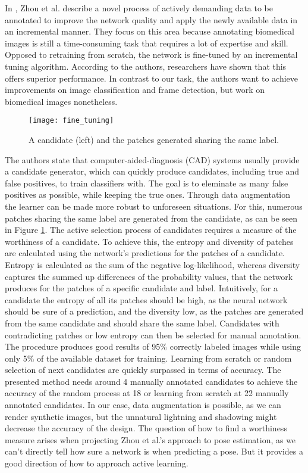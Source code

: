 In \cite{zhou}, Zhou et al. describe a novel process of actively demanding data to be annotated to improve the network quality and apply the newly available data in an incremental manner. They focus on this area because annotating biomedical images is still a time-consuming task that requires a lot of expertise and skill.
\nnewline
Opposed to retraining from scratch, the network is fine-tuned by an incremental tuning algorithm. According to the authors, researchers have shown that this offers superior performance. In contrast to our task, the authors want to achieve improvements on image classification and frame detection, but work on biomedical images nonetheless.
\nnewline
\begin{figure}[!tbp]
	\centering
    \texttt{[image: fine\_tuning]}
	\caption{A candidate (left) and the patches generated sharing the same label. \cite{zhou}}
	\label{fig:zhou}
\end{figure}
The authors state that computer-aided-diagnosis (CAD) systems usually provide a candidate generator, which can quickly produce candidates, including true and false positives, to train classifiers with. The goal is to eleminate as many false positives as possible, while keeping the true ones. Through data augmentation the learner can be made more robust to unforeseen situations. For this, numerous patches sharing the same label are generated from the candidate, as can be seen in Figure \ref{fig:zhou}. 
\nnewline
The active selection process of candidates requires a measure of the worthiness of a candidate. To achieve this, the entropy and diversity of patches are calculated using the network's predictions for the patches of a candidate. Entropy is calculated as the sum of the negative log-likelihood, whereas diversity captures the summed up differences of the probability values, that the network produces for the patches of a specific candidate and label. Intuitively, for a candidate the entropy of all its patches should be high, as the neural network should be sure of a prediction, and the diversity low, as the patches are generated from the same candidate and should share the same label. Candidates with contradicting patches or low entropy can then be selected for manual annotation.
\nnewline
The procedure produces good results of 95\% correctly labeled images while using only 5\% of the available dataset for training. Learning from scratch or random selection of next candidates are quickly surpassed in terms of accuracy. The presented method needs around 4 manually annotated candidates to achieve the accuracy of the random process at 18 or learning from scratch at 22 manually annotated candidates.
\nnewline
In our case, data augmentation is possible, as we can render synthetic images, but the unnatural lightning and shadowing might decrease the accuracy of the design. The question of how to find  a worthiness measure arises when projecting Zhou et al.'s approach to pose estimation, as we can't directly tell how sure a network is when predicting a pose. But it provides a good direction of how to approach active learning.

